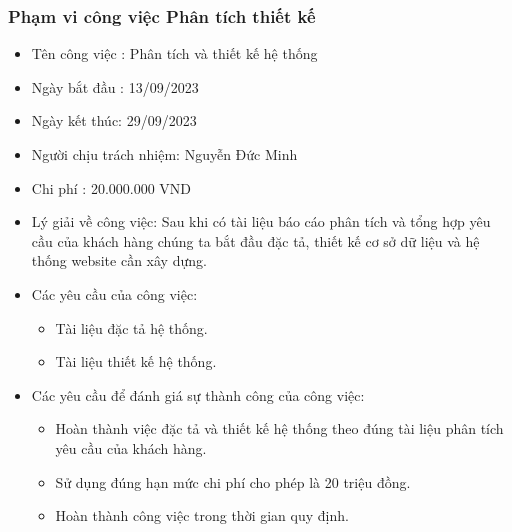 \documentclass[12pt]{article}
\begin{document}
\subsubsection{Phạm vi công việc Phân tích thiết kế}
\begin{itemize}[label=-, leftmargin=1cm]
    \item Tên công việc : Phân tích và thiết kế hệ thống
    \item Ngày bắt đầu : 13/09/2023
    \item Ngày kết thúc: 29/09/2023
    \item Người chịu trách nhiệm: Nguyễn Đức Minh
    \item Chi phí : 20.000.000 VND
    \item Lý giải về công việc: Sau khi có tài liệu báo cáo phân tích và tổng hợp yêu cầu của khách hàng chúng ta bắt đầu đặc tả, thiết kế cơ sở dữ liệu và hệ thống website cần xây dựng.
    \item Các yêu cầu của công việc:
    \begin{itemize}[label=+, leftmargin=1cm]
        \item Tài liệu đặc tả hệ thống.
        \item Tài liệu thiết kế hệ thống.
    \end{itemize}
    \item Các yêu cầu để đánh giá sự thành công của công việc:
    \begin{itemize}[label=+, leftmargin=1cm]
        \item Hoàn thành việc đặc tả và thiết kế hệ thống theo đúng tài liệu phân tích yêu cầu của khách hàng.
        \item Sử dụng đúng hạn mức chi phí cho phép là 20 triệu đồng.
        \item Hoàn thành công việc trong thời gian quy định.
    \end{itemize}
\end{itemize}
\end{document}

